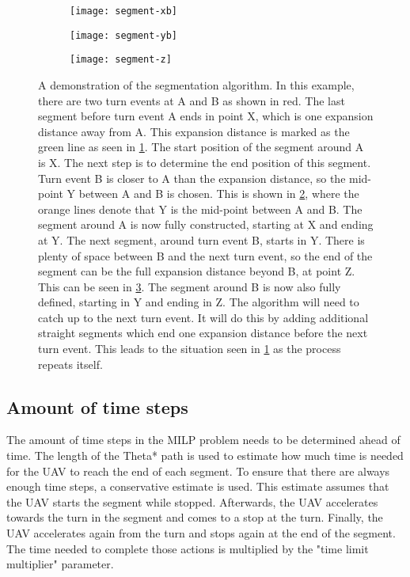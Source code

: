 \begin{figure}[h]
	\centering
	\begin{subfigure}[t]{0.3\columnwidth}
        		\texttt{[image: segment-xb]}
        		\caption{}
        		 \label{fig:segment-demo-x}
	\end{subfigure}	
	\hfill
	\begin{subfigure}[t]{0.3\columnwidth}
        		\texttt{[image: segment-yb]}
        		\caption{}
        		 \label{fig:segment-demo-y}
	\end{subfigure}	
		\hfill
	\begin{subfigure}[t]{0.3\columnwidth}
        		\texttt{[image: segment-z]}
        		\caption{}
        		 \label{fig:segment-demo-z}
	\end{subfigure}	
	\caption[A demonstration of the segmentation algorithm]{A demonstration of the segmentation algorithm. In this example, there are two turn events at A and B as shown in red. The last segment before turn event A ends in point X, which is one expansion distance away from A. This expansion distance is marked as the green line as seen in \ref{fig:segment-demo-x}. The start position of the segment around A is X. The next step is to determine the end position of this segment. Turn event B is closer to A than the expansion distance, so the mid-point Y between A and B is chosen. This is shown in \ref{fig:segment-demo-y}, where the orange lines denote that Y is the mid-point between A and B. The segment around A is now fully constructed, starting at X and ending at Y. The next segment, around turn event B, starts in Y. There is plenty of space between B and the next turn event, so the end of the segment can be the full expansion distance beyond B, at point Z. This can be seen in \ref{fig:segment-demo-z}. The segment around B is now also fully defined, starting in Y and ending in Z. The algorithm will need to catch up to the next turn event. It will do this by adding additional straight segments which end one expansion distance before the next turn event. This leads to the situation seen in \ref{fig:segment-demo-x} as the process repeats itself.}
    \label{fig:segment-demo}     
\end{figure}

\subsection{Amount of time steps}
The amount of time steps in the MILP problem needs to be determined ahead of time. The length of the Theta* path is used to estimate how much time is needed for the UAV to reach the end of each segment. To ensure that there are always enough time steps, a conservative estimate is used. This estimate assumes that the UAV starts the segment while stopped. Afterwards, the UAV accelerates towards the turn in the segment and comes to a stop at the turn. Finally, the UAV accelerates again from the turn and stops again at the end of the segment. The time needed to complete those actions is multiplied by the "time limit multiplier" parameter.

